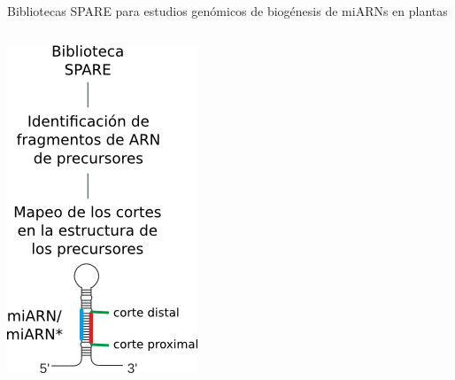 \documentclass{beamer}
\begin{document}
\begin{frame}{Bibliotecas SPARE para estudios genómicos de biogénesis de miARNs en plantas}
\begin{columns}
    \begin{column}{0.3\textwidth}
		\includegraphics[width=.6\textwidth]{img/GR_fig1C.png}
    \end{column}
    \begin{column}{0.7\textwidth}
    \end{column}
\end{columns}
\end{frame}
\end{document}
